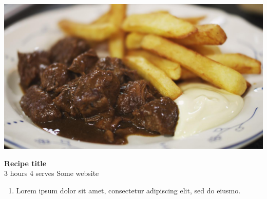 \documentclass{article}
\newcommand{\recipesection}[1]{
    \LARGE\textcolor{darkcol}{\textbf{#1}}
}
\newcommand{\preparationitem}[1]{
    \normalsize\item{#1}
}
\newcommand{\recipetext}[1]{
    \textcolor{darkcol}{#1}
}
\begin{document}
\setlength{\columnsep}{2.2em}
\setlength{\columnseprule}{4pt}
\begin{paracol}{2}
\begin{leftcolumn}

\begin{center}
\includegraphics[width=\linewidth]{frietstoofvlees.jpg}%
\end{center}
\recipesection{Recipe title} %
\vspace{0pt}
\\
\textcolor{darkcol}{\normalsize\faClockO\recipetext
{3 hours} %
}
\textcolor{darkcol}{\normalsize\faUser\recipetext
{4 serves} %
}
\textcolor{darkcol}{\normalsize\faNewspaperO\recipetext
{Some website} %
}
\vspace{5pt}
\begin{enumerate}[wide, labelwidth=!, labelindent=0pt]
        \preparationitem{Lorem ipsum dolor sit amet, consectetur adipiscing elit, sed do eiusmo.} %
        

\end{enumerate}
\end{leftcolumn}
\end{paracol}
\end{document}
